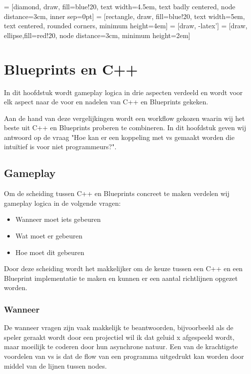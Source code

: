\lstset {language=C++}
 = [diamond, draw, fill=blue!20, 
    text width=4.5em, text badly centered, node distance=3cm, inner sep=0pt]
 = [rectangle, draw, fill=blue!20, 
    text width=5em, text centered, rounded corners, minimum height=4em]
 = [draw, -latex']
 = [draw, ellipse,fill=red!20, node distance=3cm,
    minimum height=2em]

\chapter{Blueprints en C++}
\label{ch:BlueprintsEnCpp}

In dit hoofdstuk wordt gameplay logica in drie aspecten verdeeld en wordt voor elk aspect naar de voor en nadelen van C++ en Blueprints gekeken.

Aan de hand van deze vergelijkingen wordt een workflow gekozen waarin wij het beste uit C++ en Blueprints proberen te combineren.
In dit hoofdstuk geven wij antwoord op de vraag "Hoe kan er een koppeling met \gls{vs} gemaakt worden die intuïtief is voor niet programmeurs?".

\section{Gameplay}

Om de scheiding tussen C++ en Blueprints concreet te maken verdelen wij gameplay logica in de volgende vragen:

\begin{itemize}
	\item Wanneer moet iets gebeuren
	\item Wat moet er gebeuren
	\item Hoe moet dit gebeuren
\end{itemize}

Door deze scheiding wordt het makkelijker om de keuze tussen een C++ en een Blueprint implementatie te maken en kunnen er een aantal richtlijnen opgezet worden.

\subsection{Wanneer}
De wanneer vragen zijn vaak makkelijk te beantwoorden, bijvoorbeeld als de speler geraakt wordt door een projectiel wil ik dat geluid x afgespeeld wordt, maar moeilijk te coderen door hun asynchrone natuur. Een van de krachtigste voordelen van \gls{vs} is dat de flow van een programma uitgedrukt kan worden door middel van de lijnen tussen nodes. 

